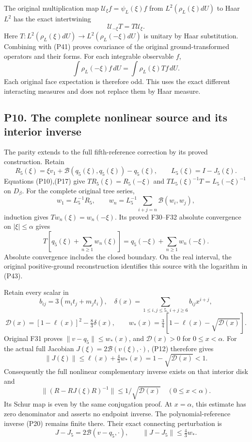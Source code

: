 \documentclass[11pt]{article}
\begin{document}
The original multiplication map \(\mathcal U_\xi f=\psi_L(\xi)f\) from \(L^2(\rho_L(\xi)dU)\) to Haar \(L^2\) has the exact intertwining
\[
 \mathcal U_{-\xi}T=T\mathcal U_\xi.
\]
Here \(T:L^2(\rho_L(\xi)dU)\to L^2(\rho_L(-\xi)dU)\) is unitary by Haar substitution. Combining with (P41) proves covariance of the original ground-transformed operators and their forms. For each integrable observable \(f\),
\[
 \int\rho_L(-\xi)f\,dU=\int\rho_L(\xi)Tf\,dU.
\]
Each original face expectation is therefore odd. This uses the exact different interacting measures and does not replace them by Haar measure.

\subsection*{P10. The complete nonlinear source and its interior inverse}

The parity extends to the full fifth-reference correction by its proved construction. Retain
\[
 R_5(\xi)=\xi v_1+\mathcal B(q_5(\xi),q_5(\xi))-q_5(\xi),\qquad
 L_5(\xi)=I-J_5(\xi).
\]
Equations (P10),(P17) give \(TR_5(\xi)=R_5(-\xi)\) and \(TL_5(\xi)^{-1}T=L_5(-\xi)^{-1}\) on \(D_\beta\). For the complete original tree series,
\[
 w_1=L_5^{-1}R_5,\qquad
 w_n=L_5^{-1}\sum_{i+j=n}\mathcal B(w_i,w_j),
\]
induction gives \(Tw_n(\xi)=w_n(-\xi)\). Its proved F30–F32 absolute convergence on \(|\xi|\le\alpha\) gives
\[
 T[q_5(\xi)+\sum_{n\ge1}w_n(\xi)]
 =q_5(-\xi)+\sum_{n\ge1}w_n(-\xi). \tag{P44}
\]
Absolute convergence includes the closed boundary. On the real interval, the original positive-ground reconstruction identifies this source with the logarithm in (P43).

Retain every scalar in
\[
 b_{ij}=3(m_it_j+m_jt_i),\quad
 \delta(x)=\sum_{1\le i,j\le5,\ i+j\ge6}b_{ij}x^{i+j},
\]
\[
 \mathscr D(x)=[1-\ell(x)]^2-\tfrac83\delta(x),\qquad
 w_*(x)=\tfrac34[1-\ell(x)-\sqrt{\mathscr D(x)}].
\]
Original F31 proves \(\|v-q_5\|\le w_*(x)\), and \(\mathscr D(x)>0\) for \(0\le x<\alpha\). For the actual full Jacobian \(J(\xi)=2\mathcal B(v(\xi),\cdot)\), (P12) therefore gives
\[
 \|J(\xi)\|\le\ell(x)+\tfrac43w_*(x)
 =1-\sqrt{\mathscr D(x)}<1.
\]
Consequently the full nonlinear complementary inverse exists on that interior disk and
\[
 \boxed{\|(R-RJ(\xi)R)^{-1}\|
 \le1/\sqrt{\mathscr D(x)}\quad(0\le x<\alpha).} \tag{P45}
\]
Its Schur map is even by the same conjugation proof. At \(x=\alpha\), this estimate has zero denominator and asserts no endpoint inverse. The polynomial-reference inverse (P20) remains finite there. Their exact connecting perturbation is
\[
 J-J_5=2\mathcal B(v-q_5,\cdot),\qquad
 \|J-J_5\|\le\tfrac43w_*.
\]
\end{document}
